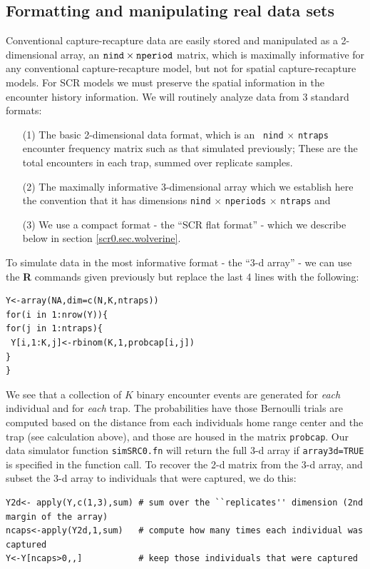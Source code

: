 \subsection{Formatting and manipulating real data sets}
\label{scr0.sec.formats}

Conventional capture-recapture data are easily stored and manipulated
as a 2-dimensional array, an $\mbox{\tt nind} \times \mbox{\tt
  nperiod}$ matrix, which is maximally informative for any
conventional capture-recapture model, but not for spatial
capture-recapture models.  For SCR models we must preserve the spatial
information in the encounter history information. We will routinely
analyze data from 3 standard formats:
\begin{itemize}
\item[(1)] The basic 2-dimensional data format, which is an \mbox{\tt
    nind} $\times$ \mbox{\tt ntraps} encounter frequency matrix such
  as that simulated previously; These are the total encounters in each
  trap, summed over replicate samples.
\item[(2)] The maximally informative 3-dimensional array which we
  establish here the convention that it has dimensions \mbox{\tt nind}
  $\times$ \mbox{\tt nperiods} $\times$ \mbox{\tt ntraps} and
\item[(3)] We use a compact format - the ``SCR flat format'' - which
  we describe below in section \ref{scr0.sec.wolverine}.
\end{itemize}
To simulate data in the most informative format - the ``3-d array'' -
we can use the {\bf R} commands given previously but replace the last
4 lines with the following:
{\small
\begin{verbatim}
Y<-array(NA,dim=c(N,K,ntraps))
for(i in 1:nrow(Y)){
for(j in 1:ntraps){
 Y[i,1:K,j]<-rbinom(K,1,probcap[i,j])
}
}
\end{verbatim}
}
We see that a collection of $K$ binary encounter events are generated
for {\it each} individual and for {\it each} trap.  The probabilities
have those Bernoulli trials are computed based on the distance from
each individuals home range center and the trap (see calculation
above), and those are housed in the matrix \mbox{\tt probcap}. Our data simulator
function \mbox{\tt simSRC0.fn} will return the full 3-d array if
\mbox{\tt array3d=TRUE} is specified in the function call.  To recover
the 2-d matrix from the 3-d array, and subset the 3-d array to
individuals that were captured, we do this:
{\small
\begin{verbatim}
Y2d<- apply(Y,c(1,3),sum) # sum over the ``replicates'' dimension (2nd margin of the array)
ncaps<-apply(Y2d,1,sum)   # compute how many times each individual was captured
Y<-Y[ncaps>0,,]           # keep those individuals that were captured
\end{verbatim}
}

